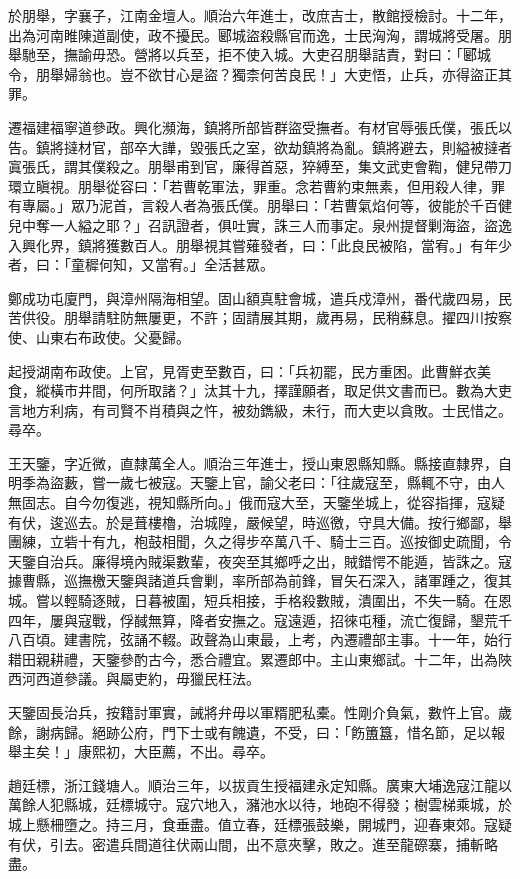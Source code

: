 \begin{pinyinscope}
於朋舉，字襄子，江南金壇人。順治六年進士，改庶吉士，散館授檢討。十二年，出為河南睢陳道副使，政不擾民。郾城盜殺縣官而逸，士民洶洶，謂城將受屠。朋舉馳至，撫諭毋恐。營將以兵至，拒不使入城。大吏召朋舉詰責，對曰：「郾城令，朋舉婦翁也。豈不欲甘心是盜？獨柰何苦良民！」大吏悟，止兵，亦得盜正其罪。

遷福建福寧道參政。興化瀕海，鎮將所部皆群盜受撫者。有材官辱張氏僕，張氏以告。鎮將撻材官，部卒大譁，毀張氏之室，欲劫鎮將為亂。鎮將避去，則縊被撻者寘張氏，謂其僕殺之。朋舉甫到官，廉得首惡，猝縛至，集文武吏會鞫，健兒帶刀環立瞋視。朋舉從容曰：「若曹乾軍法，罪重。念若曹約束無素，但用殺人律，罪有專屬。」眾乃泥首，言殺人者為張氏僕。朋舉曰：「若曹氣焰何等，彼能於千百健兒中奪一人縊之耶？」召訊證者，俱吐實，誅三人而事定。泉州提督剿海盜，盜逸入興化界，鎮將獲數百人。朋舉視其嘗薙發者，曰：「此良民被陷，當宥。」有年少者，曰：「童穉何知，又當宥。」全活甚眾。

鄭成功屯廈門，與漳州隔海相望。固山額真駐會城，遣兵戍漳州，番代歲四易，民苦供役。朋舉請駐防無屢更，不許；固請展其期，歲再易，民稍蘇息。擢四川按察使、山東右布政使。父憂歸。

起授湖南布政使。上官，見胥吏至數百，曰：「兵初罷，民方重困。此曹鮮衣美食，縱橫市井間，何所取諸？」汰其十九，擇謹願者，取足供文書而已。數為大吏言地方利病，有司賢不肖積與之忤，被劾鐫級，未行，而大吏以貪敗。士民惜之。尋卒。

王天鑒，字近微，直隸萬全人。順治三年進士，授山東恩縣知縣。縣接直隸界，自明季為盜藪，嘗一歲七被寇。天鑒上官，諭父老曰：「往歲寇至，縣輒不守，由人無固志。自今勿復逃，視知縣所向。」俄而寇大至，天鑒坐城上，從容指揮，寇疑有伏，逡巡去。於是葺樓櫓，治城隍，嚴候望，時巡徼，守具大備。按行鄉鄙，舉團練，立砦十有九，枹鼓相聞，久之得步卒萬八千、騎士三百。巡按御史疏聞，令天鑒自治兵。廉得境內賊渠數輩，夜突至其鄉呼之出，賊錯愕不能遁，皆誅之。寇據曹縣，巡撫檄天鑒與諸道兵會剿，率所部為前鋒，冒矢石深入，諸軍踵之，復其城。嘗以輕騎逐賊，日暮被圍，短兵相接，手格殺數賊，潰圍出，不失一騎。在恩四年，屢與寇戰，俘馘無算，降者安撫之。寇遠遁，招徠屯種，流亡復歸，墾荒千八百頃。建書院，弦誦不輟。政聲為山東最，上考，內遷禮部主事。十一年，始行耤田親耕禮，天鑒參酌古今，悉合禮宜。累遷郎中。主山東鄉試。十二年，出為陜西河西道參議。與屬吏約，毋獵民枉法。

天鑒固長治兵，按籍討軍實，誡將弁毋以軍糈肥私橐。性剛介負氣，數忤上官。歲餘，謝病歸。絕跡公府，門下士或有餽遺，不受，曰：「飭簠簋，惜名節，足以報舉主矣！」康熙初，大臣薦，不出。尋卒。

趙廷標，浙江錢塘人。順治三年，以拔貢生授福建永定知縣。廣東大埔逸寇江龍以萬餘人犯縣城，廷標城守。寇穴地入，瀦池水以待，地砲不得發；樹雲梯乘城，於城上懸柵墮之。持三月，食垂盡。值立春，廷標張鼓樂，開城門，迎春東郊。寇疑有伏，引去。密遣兵間道往伏兩山間，出不意夾擊，敗之。進至龍磜寨，捕斬略盡。


\end{pinyinscope}
